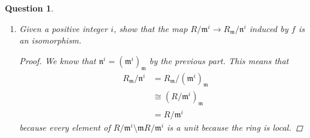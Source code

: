 \documentclass{article}
\newcommand{\maxid}{\mathfrak{m}}
\newcommand{\maxidd}{\mathfrak{n}}
\newtheorem{question}{Question}
\theoremstyle{definition}
\begin{document}
\begin{question}
\begin{enumerate}[a]
              \begin{proof}
                  Using properties of localisation gives
                  \begin{align*}
                      \maxid^{i}\otimes R_{\maxid} & \cong(\maxid^{i})_{\maxid} \\
                                                   & =\maxid^{i}R_{\maxid}.
                  \end{align*}
                  Therefore showing the desired statement is equivalent to
                  showing
                  \[
                      \maxid^{i}R_{\maxid}=\maxidd^{i}=(\maxid R_{\maxid})^{i}.
                  \]
                  The right to left inclusion is immediate and so we will focus
                  on the left to right inclusion.

                  We will show this by showing the generators of
                  \(\maxid^{i}R_{\maxid}\) are in the left ideal. This is
                  sufficient. Take any \(\prod_{j=1}^{i}a_{i}\) for
                  \(a_{i}\in\maxid\). The elements of this form generate
                  \(\maxid^{i}\). For any \(\nicefrac{x}{y}\in R_{\maxid}\)
                  where
                  \[
                      b_{i}=\begin{cases}
                          y & i=1,    \\
                          1 & i\neq1.
                      \end{cases}
                  \]
                  This means that the ideals \(\maxid^{i}R_{\maxid}\) and
                  \(\maxidd^{i}\) are equal.
              \end{proof}

        \item Given a positive integer \(i\), show that the map
              \(R/\maxid^{i}\to R_{\maxid}/\maxidd^{i}\) induced by \(f\) is an
              isomorphism.

              \begin{proof}
                  We know that \(\maxidd^{i}=(\maxid^{i})_{\maxid}\) by the
                  previous part. This means that
                  \begin{align*}
                      R_{\maxid}/\maxidd^{i} & =R_{\maxid}/(\maxid^{i})_{\maxid} \\
                                             & \cong(R/\maxid^{i})_{\maxid}      \\
                                             & =R/\maxid^{i}
                  \end{align*}
                  because every element of \(R/\maxid^{i}\setminus \maxid
                  R/\maxid^{i}\) is a unit because the ring is local.


\end{proof}
\end{enumerate}
\end{question}
\end{document}
